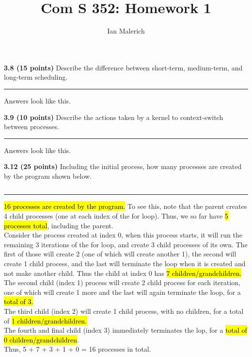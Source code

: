 \documentclass[12pt]{jhwhw}
\author{Ian Malerich}
\title{Com S 352: Homework 1}
\begin{document}
\raggedright

\textbf{3.8 (15 points)} Describe the difference between short-term, medium-term, and 
	long-term scheduling.
\textcolor[RGB]{240,240,240}{\rule{\textwidth}{0.5pt}}\bigbreak

	\begin{addmargin}[1em]{}
		Answers look like this.
	\end{addmargin}

\bigbreak
\textbf{3.9 (10 points)} Describe the actions taken by a kernel to context-switch
	between processes.
\textcolor[RGB]{240,240,240}{\rule{\textwidth}{0.5pt}}\bigbreak

	\begin{addmargin}[1em]{}
		Answers look like this.
	\end{addmargin}

\bigbreak
\textbf{3.12 (25 points)} Including the initial process, how many processes are created by 
	the program shown below.
\inputminted{c}{3.12.c}
\textcolor[RGB]{240,240,240}{\rule{\textwidth}{0.5pt}}\bigbreak

	\begin{addmargin}[1em]{}
		\hl{16 processes are created by the program.}
		\bigbreak
		To see this, note that the parent creates 4 child processes (one at each
		index of the for loop). Thus, we so far have \hl{5 processes total}, 
		including the parent. \\
		Consider the process created at index 0, when this process starts, it will run
		the remaining 3 iterations of the for loop, and create 3 child processes of its
		own. The first of those will create 2 (one of which will create another 1), the second
		will create 1 child process, and the last will terminate the loop when it is created
		and not make another child. Thus the child at index 0 has \hl{7 children/grandchildren.} \\
		The second child (index 1) process will create 2 child process for each iteration, one of
		which will create 1 more and the last will again terminate the loop, 
		for a \hl{total of 3.} \\
		The third child (index 2) will create 1 child process, with no children, 
		for a total of \hl{1 children/grandchildren.} \\
		The fourth and final child (index 3) immediately terminates the lop, 
		for a \hl{total of 0 children/grandchildren}.
		\\
		Thus, 5 + 7 + 3 + 1 + 0 = 16 processes in total.
	\end{addmargin}
\end{document}
